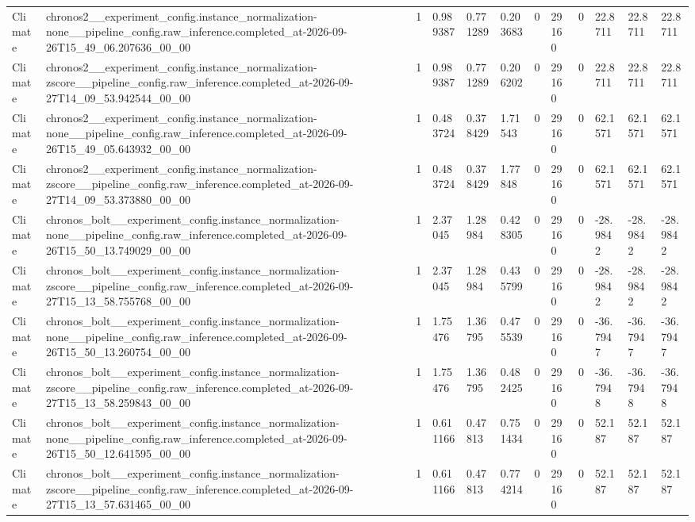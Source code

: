 \begin{tabular}{llllllllllll}
Climate & chronos2\_\_experiment\_config.instance\_normalization-none\_\_pipeline\_config.raw\_inference.completed\_at-2026-09-26T15\_49\_06.207636\_00\_00 & 1 & 0.989387 & 0.771289 & 0.203683 & 0 & 29160 & 0 & 22.8711 & 22.8711 & 22.8711 \\
Climate & chronos2\_\_experiment\_config.instance\_normalization-zscore\_\_pipeline\_config.raw\_inference.completed\_at-2026-09-27T14\_09\_53.942544\_00\_00 & 1 & 0.989387 & 0.771289 & 0.206202 & 0 & 29160 & 0 & 22.8711 & 22.8711 & 22.8711 \\
Climate & chronos2\_\_experiment\_config.instance\_normalization-none\_\_pipeline\_config.raw\_inference.completed\_at-2026-09-26T15\_49\_05.643932\_00\_00 & 1 & 0.483724 & 0.378429 & 1.71543 & 0 & 29160 & 0 & 62.1571 & 62.1571 & 62.1571 \\
Climate & chronos2\_\_experiment\_config.instance\_normalization-zscore\_\_pipeline\_config.raw\_inference.completed\_at-2026-09-27T14\_09\_53.373880\_00\_00 & 1 & 0.483724 & 0.378429 & 1.77848 & 0 & 29160 & 0 & 62.1571 & 62.1571 & 62.1571 \\
Climate & chronos\_bolt\_\_experiment\_config.instance\_normalization-none\_\_pipeline\_config.raw\_inference.completed\_at-2026-09-26T15\_50\_13.749029\_00\_00 & 1 & 2.37045 & 1.28984 & 0.428305 & 0 & 29160 & 0 & -28.9842 & -28.9842 & -28.9842 \\
Climate & chronos\_bolt\_\_experiment\_config.instance\_normalization-zscore\_\_pipeline\_config.raw\_inference.completed\_at-2026-09-27T15\_13\_58.755768\_00\_00 & 1 & 2.37045 & 1.28984 & 0.435799 & 0 & 29160 & 0 & -28.9842 & -28.9842 & -28.9842 \\
Climate & chronos\_bolt\_\_experiment\_config.instance\_normalization-none\_\_pipeline\_config.raw\_inference.completed\_at-2026-09-26T15\_50\_13.260754\_00\_00 & 1 & 1.75476 & 1.36795 & 0.475539 & 0 & 29160 & 0 & -36.7947 & -36.7947 & -36.7947 \\
Climate & chronos\_bolt\_\_experiment\_config.instance\_normalization-zscore\_\_pipeline\_config.raw\_inference.completed\_at-2026-09-27T15\_13\_58.259843\_00\_00 & 1 & 1.75476 & 1.36795 & 0.482425 & 0 & 29160 & 0 & -36.7948 & -36.7948 & -36.7948 \\
Climate & chronos\_bolt\_\_experiment\_config.instance\_normalization-none\_\_pipeline\_config.raw\_inference.completed\_at-2026-09-26T15\_50\_12.641595\_00\_00 & 1 & 0.611166 & 0.47813 & 0.751434 & 0 & 29160 & 0 & 52.187 & 52.187 & 52.187 \\
Climate & chronos\_bolt\_\_experiment\_config.instance\_normalization-zscore\_\_pipeline\_config.raw\_inference.completed\_at-2026-09-27T15\_13\_57.631465\_00\_00 & 1 & 0.611166 & 0.47813 & 0.774214 & 0 & 29160 & 0 & 52.187 & 52.187 & 52.187 \\

\end{tabular}
